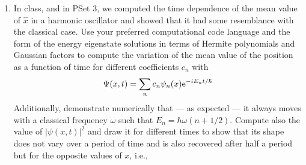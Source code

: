 \documentclass[../psets.tex]{subfiles}
\begin{document}
\begin{enumerate}
\begin{enumerate}
\begin{proof}
\begin{align*}
\begin{split}
                    & \left. +(2m+1)(2n+1)\delta_{n,m}\delta_{m,n}+\sqrt{m(m-1)}\sqrt{(n+1)(n+2)}\delta_{n,m-2}\delta_{m,n+2} \right]
                \end{split}
            \end{align*}
            When $m=n-2$, the first term will be nonzero. When $m=n$, the second term will be nonzero. And when $m=n+2$, the third term will be nonzero. Taken together, this means that
            \begin{align*}
                \begin{split}
                    \ev{x^4}{\psi_n} ={}& \frac{\hbar^2}{4m^2\omega^2}\left[ \sqrt{(n-1)n}\sqrt{n(n-1)} \right.\\
                    & \left. +(2n+1)(2n+1)+\sqrt{(n+2)(n+1)}\sqrt{(n+1)(n+2)} \right]
                \end{split}\\
                ={}& \frac{\hbar^2}{4m^2\omega^2}\left[ n(n-1)+(2n+1)^2+(n+1)(n+2) \right]\\
                \Aboxed{\ev{x^4}{\psi_n} ={}& \frac{\hbar^2}{4m^2\omega^2}(6n^2+6n+3)}
            \end{align*}
        \end{proof}
    \end{enumerate}
    \emph{Comment}: In Dirac notation, the above procedure is equivalent to adding an identity operator, in the sense that
    \begin{equation}
        \sum_m\ket{m}\bra{m} = I
    \end{equation}
    and
    \begin{equation}
        \ev{\hat{O}_1\hat{O}_2}{n} = \ev{\hat{O}_1I\hat{O}_2}{n}
        = \sum_m\mel{n}{\hat{O}_1}{m}\mel{m}{\hat{O}_2}{n}
        = \sum_mO_{1,nm}O_{2,mn}
    \end{equation}
    \item In class, and in PSet 3, we computed the time dependence of the mean value of $\hat{x}$ in a harmonic oscillator and showed that it had some resemblance with the classical case. Use your preferred computational code language and the form of the energy eigenstate solutions in terms of Hermite polynomials and Gaussian factors to compute the variation of the mean value of the position as a function of time for different coefficients $c_n$ with
    \begin{equation}
        \Psi(x,t) = \sum_nc_n\psi_n(x)\e[-iE_nt/\hbar]
    \end{equation}
    Additionally, demonstrate numerically that --- as expected --- it always moves with a classical frequency $\omega$ such that $E_n=\hbar\omega(n+1/2)$. Compute also the value of $|\psi(x,t)|^2$ and draw it for different times to show that its shape does not vary over a period of time and is also recovered after half a period but for the opposite values of $x$, i.e.,

\end{enumerate}
\end{document}
